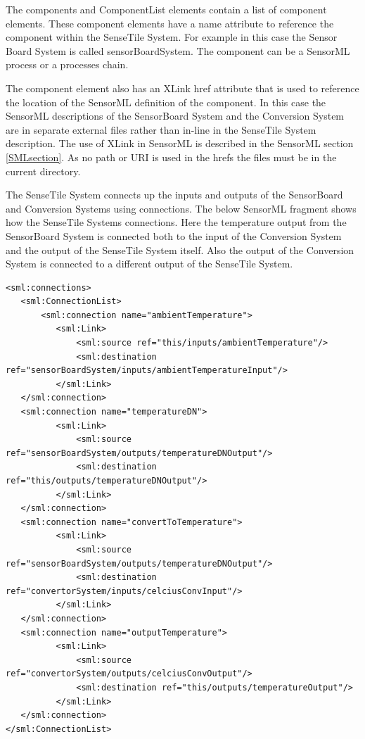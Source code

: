 \documentclass[]{final_report}
\begin{document}
The components and ComponentList elements contain a list of component elements. These component elements have a name attribute to reference the component within the SenseTile System. For example in this case the Sensor Board System is called sensorBoardSystem. The component can be a SensorML process or a processes chain.

The component element also has an XLink href attribute that is used to reference the location of the SensorML definition of the component.  In this case the SensorML descriptions of the SensorBoard System and the Conversion System are in separate external files rather than in-line in the SenseTile System description. The use of XLink in SensorML is described in the SensorML section \ref{SMLsection}. As no path or URI is used in the hrefs the files must be in the current directory.

The SenseTile System connects up the inputs and outputs of the SensorBoard and Conversion Systems using connections. The below SensorML fragment shows how the SenseTile Systems connections. Here the temperature output from the SensorBoard System is connected both to the input of the Conversion System and the output of the SenseTile System itself. Also the output of the Conversion System is connected to a different output of the SenseTile System.

\begin{lstlisting}
<sml:connections>
   <sml:ConnectionList>
       <sml:connection name="ambientTemperature">
          <sml:Link>
              <sml:source ref="this/inputs/ambientTemperature"/>
              <sml:destination ref="sensorBoardSystem/inputs/ambientTemperatureInput"/>
          </sml:Link>
   </sml:connection>
   <sml:connection name="temperatureDN">
          <sml:Link>
              <sml:source ref="sensorBoardSystem/outputs/temperatureDNOutput"/>
              <sml:destination ref="this/outputs/temperatureDNOutput"/>
          </sml:Link>
   </sml:connection>
   <sml:connection name="convertToTemperature">
          <sml:Link>
              <sml:source ref="sensorBoardSystem/outputs/temperatureDNOutput"/>
              <sml:destination ref="convertorSystem/inputs/celciusConvInput"/>
          </sml:Link>
   </sml:connection>
   <sml:connection name="outputTemperature">
          <sml:Link>
              <sml:source ref="convertorSystem/outputs/celciusConvOutput"/>
              <sml:destination ref="this/outputs/temperatureOutput"/>
          </sml:Link>
   </sml:connection>
</sml:ConnectionList>
\end{lstlisting}
\end{document}
